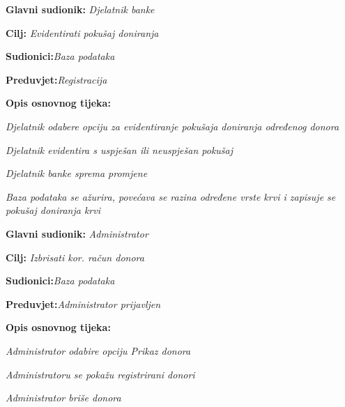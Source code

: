 \noindent {}
\begin{packed_item}
	
	\item \textbf{Glavni sudionik: }\textit{Djelatnik banke}\eject
	\item  \textbf{Cilj:} \textit{Evidentirati pokušaj doniranja}\eject
	\item  \textbf{Sudionici:}\textit{Baza podataka}\eject 
	\item  \textbf{Preduvjet:}\textit{Registracija}\eject
	\item  \textbf{Opis osnovnog tijeka:}
	
	\item[] \begin{packed_enum}
		
		\item \textit{Djelatnik odabere opciju za evidentiranje pokušaja doniranja određenog donora}\eject
		\item \textit{Djelatnik evidentira s uspješan ili neuspješan pokušaj}\eject 
		\item \textit{Djelatnik banke sprema promjene}\eject 
		\item \textit{Baza podataka se ažurira, povećava se razina određene vrste krvi i zapisuje se pokušaj doniranja krvi}\eject
		
	\end{packed_enum}
	
\end{packed_item}
\noindent {}
\begin{packed_item}
	
	\item \textbf{Glavni sudionik: }\textit{Administrator}\eject
	\item  \textbf{Cilj:} \textit{Izbrisati kor. račun donora}\eject
	\item  \textbf{Sudionici:}\textit{Baza podataka}\eject 
	\item  \textbf{Preduvjet:}\textit{Administrator prijavljen}\eject
	\item  \textbf{Opis osnovnog tijeka:}
	
	\item[] \begin{packed_enum}
		
		\item \textit{Administrator odabire opciju Prikaz donora}\eject
		\item \textit{Administratoru se pokažu registrirani donori}\eject 
		\item \textit{Administrator briše donora}\eject 
		
	\end{packed_enum}
	
\end{packed_item}

